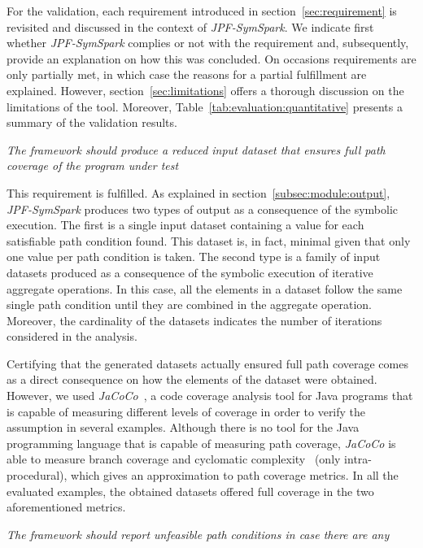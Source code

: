 
For the validation, each requirement introduced in section~\ref{sec:requirement} is revisited and discussed in the context of \textit{JPF-SymSpark}. We indicate first whether \textit{JPF-SymSpark} complies or not with the requirement and, subsequently, provide an explanation on how this was concluded. On occasions requirements are only partially met, in which case the reasons for a partial fulfillment are explained. However, section~\ref{sec:limitations} offers a thorough discussion on the limitations of the tool. Moreover, Table~\ref{tab:evaluation:quantitative} presents a summary of the validation results.

\begin{itemize}
 \textit{The framework should produce a reduced input dataset that ensures full path coverage of the program under test}

This requirement is fulfilled. As explained in section~\ref{subsec:module:output}, \textit{JPF-SymSpark} produces two types of output as a consequence of the symbolic execution. The first is a single input dataset containing a value for each satisfiable path condition found. This dataset is, in fact, minimal given that only one value per path condition is taken. The second type is a family of input datasets produced as a consequence of the symbolic execution of iterative aggregate operations. In this case, all the elements in a dataset follow the same single path condition until they are combined in the aggregate operation. Moreover, the cardinality of the datasets indicates the number of iterations considered in the analysis.

Certifying that the generated datasets actually ensured full path coverage comes as a direct consequence on how the elements of the dataset were obtained. However, we used \textit{JaCoCo}~\cite{JaCoCo2017}, a code coverage analysis tool for Java programs that is capable of measuring different levels of coverage in order to verify the assumption in several examples. Although there is no tool for the Java programming language that is capable of measuring path coverage, \textit{JaCoCo} is able to measure branch coverage and cyclomatic complexity~\cite{McCabe1976} (only intra-procedural), which gives an approximation to path coverage metrics. In all the evaluated examples, the obtained datasets offered full coverage in the two aforementioned metrics.

 \textit{The framework should report unfeasible path conditions in case there are any}


\end{itemize}
